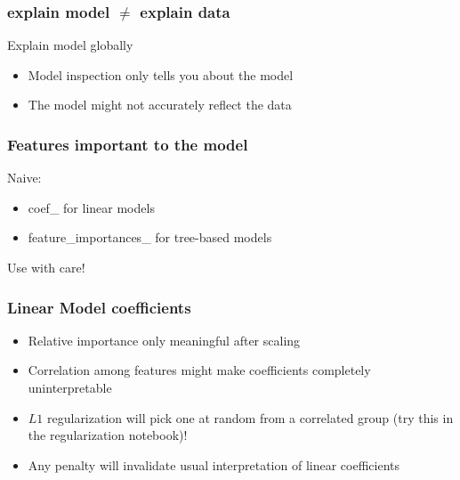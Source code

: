 \documentclass[compress, aspectratio=54]{beamer}
\begin{document}
\begin{frame}
\frametitle{explain model $\neq$ explain data}
Explain model globally

\begin{itemize}
\item Model inspection only tells you about the model

\item The model might not accurately reflect the data

\end{itemize}
\end{frame}



\begin{frame}
\frametitle{Features important to the model}
Naive:
\begin{itemize}
	\item coef\_ for linear models


	\item feature\_importances\_ for tree-based models

\end{itemize}
Use with care!
\end{frame}


\begin{frame}
\frametitle{Linear Model coefficients}
\begin{itemize}
\item Relative importance only meaningful after scaling
\item Correlation among features might make coefficients completely uninterpretable

\item $L1$ regularization will pick one at random from a correlated group (try this in the regularization notebook)!
\item Any penalty will invalidate usual interpretation of linear coefficients

\end{itemize}
\end{frame}
\end{document}
